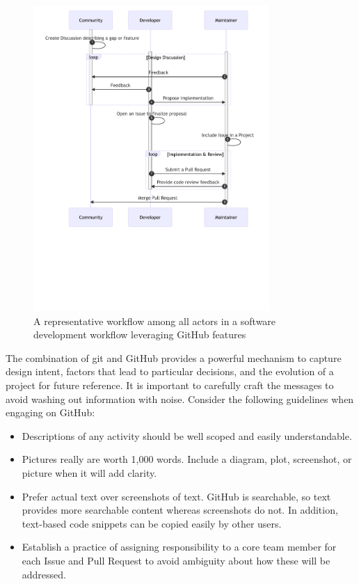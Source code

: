 \documentclass[]{nrel}
\begin{document}
\begin{figure}[htbp]
\begin{center}
\includegraphics[width=0.8\textwidth, trim = 0cm 7cm 0cm 0cm, clip]{mermaid-bfcb6a9556227d6b8158e111ddd0f37e43e4f635.pdf}
\caption{A representative workflow among all actors in a software development workflow leveraging GitHub features}
\label{fig:dev_sequence}
\end{center}
\end{figure}

The combination of git and GitHub provides a powerful mechanism to capture design intent,
factors that lead to particular decisions, and the evolution of a project for future reference.
It is important to carefully craft the messages to avoid washing out information with noise.
Consider the following guidelines when engaging on GitHub:

\begin{itemize}
\item Descriptions of any activity should be well scoped and easily understandable.
\item Pictures really are worth 1,000 words. Include a diagram, plot, screenshot, or picture
when it will add clarity.
\item Prefer actual text over screenshots of text. GitHub is searchable, so text provides more
searchable content whereas screenshots do not. In addition, text-based code snippets can be
copied easily by other users.
\item Establish a practice of assigning responsibility to a core team member for each Issue and
Pull Request to avoid ambiguity about how these will be addressed.

\end{itemize}
\end{document}
